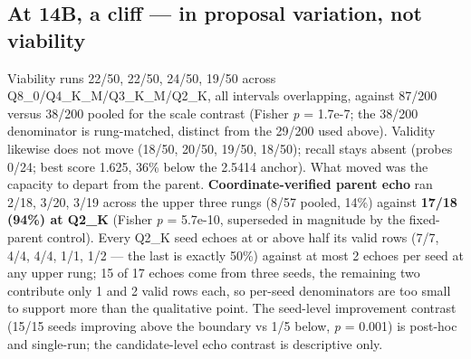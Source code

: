 \hypertarget{at-14b-a-cliff--in-proposal-variation-not-viability}{%
\subsection{At 14B, a cliff --- in proposal variation, not viability}\label{at-14b-a-cliff--in-proposal-variation-not-viability}}

Viability runs 22/50, 22/50, 24/50, 19/50 across Q8\_0/Q4\_K\_M/Q3\_K\_M/Q2\_K, all intervals overlapping, against 87/200 versus 38/200 pooled for the scale contrast (Fisher \emph{p} = 1.7e-7; the 38/200 denominator is rung-matched, distinct from the 29/200 used above). Validity likewise does not move (18/50, 20/50, 19/50, 18/50); recall stays absent (probes 0/24; best score 1.625, 36\% below the 2.5414 anchor). What moved was the capacity to depart from the parent. \textbf{Coordinate-verified parent echo} ran 2/18, 3/20, 3/19 across the upper three rungs (8/57 pooled, 14\%) against \textbf{17/18 (94\%) at Q2\_K} (Fisher \emph{p} = 5.7e-10, superseded in magnitude by the fixed-parent control). Every Q2\_K seed echoes at or above half its valid rows (7/7, 4/4, 4/4, 1/1, 1/2 --- the last is exactly 50\%) against at most 2 echoes per seed at any upper rung; 15 of 17 echoes come from three seeds, the remaining two contribute only 1 and 2 valid rows each, so per-seed denominators are too small to support more than the qualitative point. The seed-level improvement contrast (15/15 seeds improving above the boundary vs 1/5 below, \emph{p} = 0.001) is post-hoc and single-run; the candidate-level echo contrast is descriptive only.

